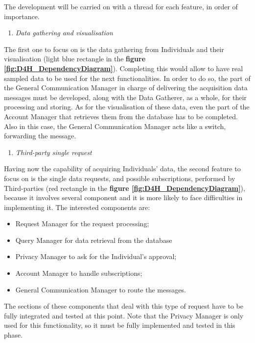     The development will be carried on with a thread for each feature, in order of importance.
    
    \begin{enumerate}
        \item \emph{Data gathering and visualisation}
    \end{enumerate}
    The first one to focus on is the data gathering from Individuals and their visualisation (light blue rectangle in the \textbf{figure \ref{fig:D4H_DependencyDiagram}}). Completing this would allow to have real sampled data to be used for the next functionalities. In order to do so, the part of the General Communication Manager in charge of delivering the acquisition data messages must be developed, along with the Data Gatherer, as a whole, for their processing and storing. As for the visualisation of these data, even the part of the Account Manager that retrieves them from the database has to be completed. Also in this case, the General Communication Manager acts like a switch, forwarding the message.
    
    \begin{enumerate} [resume]
        \item \emph{Third-party single request}
    \end{enumerate}
    Having now the capability of acquiring Individuals' data, the second feature to focus on is the single data requests, and possible subscriptions, performed by Third-parties (red rectangle in the \textbf{figure \ref{fig:D4H_DependencyDiagram}}), because it involves several component and it is more likely to face difficulties in implementing it. The interested components are:
        \begin{itemize}
            \item Request Manager for the request processing;
            \item Query Manager for data retrieval from the database
            \item Privacy Manager to ask for the Individual's approval;
            \item Account Manager to handle subscriptions;
            \item General Communication Manager to route the messages.
        \end{itemize}
    The sections of these components that deal with this type of request have to be fully integrated and tested at this point. Note that the Privacy Manager is only used for this functionality, so it must be fully implemented and tested in this phase.
    
